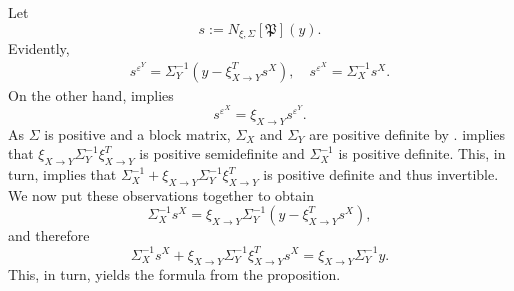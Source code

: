 \documentclass[a4paper,11pt]{report}
\begin{document}
\begin{Bew}
Let
\[
s:=N_{\xi,\Sigma}[\mathfrak{P}](y).
\]
Evidently, 
\begin{align*}
s^{\varepsilon^Y}=\Sigma_Y^{-1}(y-\xi_{X\to Y}^Ts^X), \quad
s^{\varepsilon^X}=\Sigma_X^{-1}s^X.
\end{align*}
On the other hand,  implies
\[
s^{\varepsilon^X}=\xi_{X\to Y}s^{\varepsilon^Y}.
\]
As $\Sigma$ is positive and a block matrix, $\Sigma_X$ and $\Sigma_Y$ are positive definite by .
 implies that $\xi_{X\to Y}\Sigma_Y^{-1}\xi_{X\to Y}^T$ is positive semidefinite and $\Sigma_X^{-1}$ is positive definite. This, in turn, implies that $\Sigma_{X}^{-1}+\xi_{X\to Y}\Sigma_Y^{-1}\xi_{X\to Y}^T$ is positive definite and thus invertible. We now put these observations together to obtain
\[
\Sigma_X^{-1}s^X=\xi_{X\to Y}\Sigma_Y^{-1}(y-\xi_{X\to Y}^Ts^X),
\]
and therefore
\[
\Sigma_X^{-1}s^X+\xi_{X\to Y}\Sigma_Y^{-1}\xi_{X\to Y}^Ts^X=\xi_{X\to Y}\Sigma_Y^{-1}y.
\]
This, in turn, yields the formula from the proposition.
\end{Bew}
\end{document}
